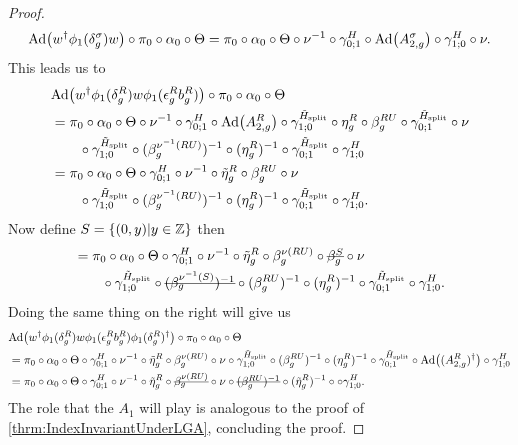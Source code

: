 \documentclass[11pt,a4paper,twoside]{article}
\numberwithin{equation}{section}
\begin{document}
\begin{proof}
	\begin{equation}
		\Ad{w^\dagger \phi_1(\delta_g^\sigma)w}\circ\pi_0\circ\alpha_0\circ\Theta=\pi_0\circ\alpha_0\circ\Theta\circ\nu^{-1}\circ\gamma^H_{0;1}\circ\Ad{A^\sigma_{2,g}}\circ\gamma^H_{1;0}\circ\nu.
	\end{equation}
	This leads us to
	\begin{align}
		&\Ad{w^\dagger\phi_1(\delta_g^R)w\phi_1(\epsilon_g^R b_g^R)}\circ\pi_0\circ\alpha_0\circ\Theta\\
		&=\pi_0\circ\alpha_0\circ\Theta\circ\nu^{-1}\circ\gamma^H_{0;1}\circ\Ad{A_{2,g}^R}\circ\gamma^{\HsplitTilde}_{1;0}\circ\eta_g^R\circ\beta_g^{RU}\circ\gamma^{\HsplitTilde}_{0;1}\circ\nu\\
		\nonumber
		&\qquad \circ\gamma^{\HsplitTilde}_{1;0}\circ(\beta_g^{\nu^{-1}(RU)})^{-1}\circ(\eta_g^R)^{-1}\circ\gamma^{\HsplitTilde}_{0;1}\circ\gamma^{H}_{1;0}\\
		&=\pi_0\circ\alpha_0\circ\Theta\circ\gamma^H_{0;1}\circ\nu^{-1}\circ\tilde\eta_g^R\circ\beta_g^{RU}\circ\nu\\
		\nonumber
		&\qquad \circ\gamma^{\HsplitTilde}_{1;0}\circ(\beta_g^{\nu^{-1}(RU)})^{-1}\circ(\eta_g^R)^{-1}\circ\gamma^{\HsplitTilde}_{0;1}\circ\gamma^{H}_{1;0}.
	\end{align}
	Now define $S=\{(0,y)|y\in\mathbb Z\}$ then
	\begin{align}
		&=\pi_0\circ\alpha_0\circ\Theta\circ\gamma^H_{0;1}\circ\nu^{-1}\circ\tilde\eta_g^R\circ\beta_g^{\nu(RU)}\circ\stkout{\beta_g^S}\circ\nu\\
		\nonumber
		&\qquad \circ\gamma^{\HsplitTilde}_{1;0}\circ\stkout{(\beta_g^{\nu^{-1}(S)})^{-1}}\circ(\beta_g^{RU})^{-1}\circ(\eta_g^R)^{-1}\circ\gamma^{\HsplitTilde}_{0;1}\circ\gamma^{H}_{1;0}.
	\end{align}
	Doing the same thing on the right will give us
	\begin{align}
		&\Ad{w^\dagger\phi_1(\delta_g^R)w\phi_1(\epsilon_g^R b_g^R)\phi_1(\delta_g^R)^\dagger}\circ\pi_0\circ\alpha_0\circ\Theta\\
		&=\pi_0\circ\alpha_0\circ\Theta\circ\gamma^H_{0;1}\circ\nu^{-1}\circ\tilde\eta_g^R\circ\beta_g^{\nu(RU)}\circ\nu\circ\gamma^{\HsplitTilde}_{1;0}\circ(\beta_g^{RU})^{-1}\circ(\eta_g^R)^{-1}\circ\gamma^{\HsplitTilde}_{0;1}\circ\Ad{(A_{2,g}^R)^\dagger}\circ\gamma^{H}_{1;0}\\
		&=\pi_0\circ\alpha_0\circ\Theta\circ\gamma^H_{0;1}\circ\nu^{-1}\circ\tilde\eta_g^R\circ\stkout{\beta_g^{\nu(RU)}}\circ\nu\circ\stkout{(\beta_g^{RU})^{-1}}\circ(\tilde\eta_g^R)^{-1}\circ\circ\gamma^{H}_{1;0}.
	\end{align}
	The role that the $A_1$ will play is analogous to the proof of \ref{thrm:IndexInvariantUnderLGA}, concluding the proof.
\end{proof}
\end{document}
